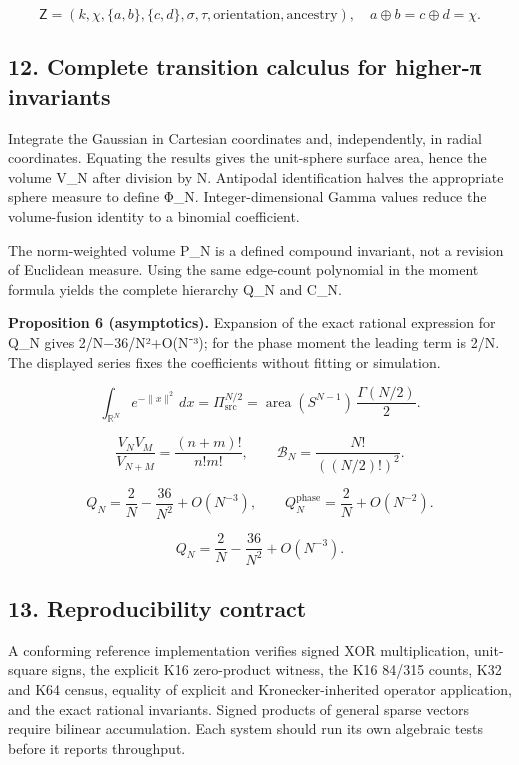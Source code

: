\documentclass[
  10pt,
]{article}
\begin{document}
\[
\mathsf Z=(k,\chi,\{a,b\},\{c,d\},\sigma,\tau,\text{orientation},\text{ancestry}),\quad a\oplus b=c\oplus d=\chi.
\]

\subsection{12. Complete transition calculus for higher-π
invariants}\label{complete-transition-calculus-for-higher-ux3c0-invariants}

Integrate the Gaussian in Cartesian coordinates and, independently, in
radial coordinates. Equating the results gives the unit-sphere surface
area, hence the volume V\_N after division by N. Antipodal
identification halves the appropriate sphere measure to define Φ\_N.
Integer-dimensional Gamma values reduce the volume-fusion identity to a
binomial coefficient.

The norm-weighted volume P\_N is a defined compound invariant, not a
revision of Euclidean measure. Using the same edge-count polynomial in
the moment formula yields the complete hierarchy Q\_N and C\_N.

\textbf{Proposition 6 (asymptotics).} Expansion of the exact rational
expression for Q\_N gives 2/N−36/N²+O(N⁻³); for the phase moment the
leading term is 2/N. The displayed series fixes the coefficients without
fitting or simulation.

\[
\int_{\mathbb R^N}e^{-\|x\|^2}\,dx=\Pi_{\mathrm{src}}^{N/2}
=\operatorname{area}(S^{N-1})\,\frac{\Gamma(N/2)}2.
\]

\[
\frac{V_NV_M}{V_{N+M}}=\frac{(n+m)!}{n!m!},\qquad
\mathcal B_N=\frac{N!}{((N/2)!)^2}.
\]

\[
Q_N=\frac2N-\frac{36}{N^2}+O(N^{-3}),\qquad
Q_N^{\mathrm{phase}}=\frac2N+O(N^{-2}).
\]

\[
\boxed{Q_N=\frac2N-\frac{36}{N^2}+O(N^{-3})}.
\]

\subsection{13. Reproducibility
contract}\label{reproducibility-contract}

A conforming reference implementation verifies signed XOR
multiplication, unit-square signs, the explicit K16 zero-product
witness, the K16 84/315 counts, K32 and K64 census, equality of explicit
and Kronecker-inherited operator application, and the exact rational
invariants. Signed products of general sparse vectors require bilinear
accumulation. Each system should run its own algebraic tests before it
reports throughput.
\end{document}
